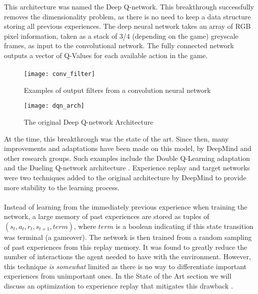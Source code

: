 This architecture was named the Deep Q-network. This breakthrough successfully removes the dimensionality problem, as there is no need to keep a data structure storing all previous experiences. The deep neural network takes an array of RGB pixel information, taken as a stack of 3/4 (depending on the game) greyscale frames, as input to the convolutional network. The fully connected network outputs a vector of Q-Values for each available action in the game. \paragraph{}

\begin{figure}[H]
    \centering
    \texttt{[image: conv\_filter]}
    \caption{Examples of output filters from a convolution neural network}
\end{figure}
\begin{figure}[H]
    \centering
    \texttt{[image: dqn\_arch]}
    \caption{The original Deep Q-network Architecture}
\end{figure}

At the time, this breakthrough was the state of the art. Since then, many improvements and adaptations have been made on this model, by DeepMind and other research groups. Such examples include the Double Q-Learning adaptation \cite{doubleq} and the Dueling Q-network architecture \cite{dueling}. Experience replay and target networks were two techniques added to the original architecture by DeepMind to provide more stability to the learning process. \paragraph{}

Instead of learning from the immediately previous experience when training the network, a large memory of past experiences are stored as tuples of $(s_t, a_t, r_{t}, s_{t+1}, term)$, where $term$ is a boolean indicating if this state transition was terminal (a gameover). The network is then trained from a random sampling of past experiences from this replay memory. It was found to greatly reduce the number of interactions the agent needed to have with the environment. However, this technique \textit{is somewhat} limited as there is no way to differentiate important experiences from unimportant ones. In the State of the Art section we will discuss an optimization to experience replay that mitigates this drawback \cite{human}. \paragraph{}


